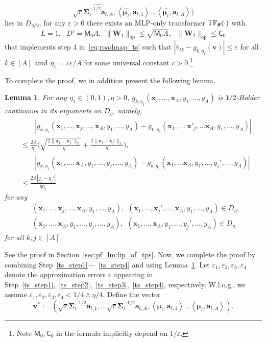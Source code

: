 \documentclass[10pt]{article}
\newtheorem{lemma}[theorem]{Lemma}
\newcommand{\eps}{\varepsilon}
\newcommand{\lops}[1]{\|{#1}\|_{\mathrm{op}}}
\newcommand{\<}{\left\langle}
\renewcommand{\>}{\right\rangle}
\newcommand{\TF}{{\rm TF}}
\newcommand{\Tpsmean}{{{\mathbf\mu}}}
\newcommand{\Tpscov}{{{\mathbf\Sigma}}}
\newcommand{\Tpsparn}{{r}}
\newcommand{\trunprob}{{\eta_1}}
\newcommand{\Trunreg}{{D}}
\newcommand{\Trunregp}{{\eta}}
\newcommand{\bigvec}{{\mathbf{v}}}
\newcommand{\neuron}{{\mathsf{M_0}}}
\newcommand{\weightn}{{{\mathsf{C_0}}}}
\def\bW{{\mathbf W}}
\def\btheta{{\boldsymbol \theta}}
\def\ba{{\mathbf a}}
\def\bx{{\mathbf x}}
\begin{document}
\begin{enumerate}[label=Step \arabic*,ref= \arabic*]
$$        \sqrt{\Tpsparn}\widehat{\Tpscov_t^{-1/2}\ba_{t,A}},
        \<\widehat{\Tpsmean_t},\ba_{t,1}\>\ldots
        \<\widehat{\Tpsmean_t},\ba_{t,A}\>)$$ lies in $\Trunreg_{\Trunregp/2}$, for any $\eps>0$ there exists an MLP-only transformer $\TF_\btheta(\cdot)$ with
    $$
    L=1,~~~D'= \neuron A,~~\lops{\bW_1}\leq \sqrt{\neuron A}, ~~~\lops{\bW_2}\leq \weightn$$
  that implements step 4 in~\eqref{eq:roadmap_ts} such that $|\widehat v_{tk}-g_{k,\trunprob}(\bigvec)|\leq \eps$ for all $k\in[A]$ amd $\trunprob=c\eps/A$ for some universal constant $c>0$.\footnote{Note $\neuron,\weightn$ in the formula implicitly depend on $1/\eps$.}
\end{enumerate}
To complete the proof, we in addition present the following lemma.
\begin{lemma}\label{lm:lip_of_tps}
For any $\trunprob\in(0,1),\Trunregp>0$, $g_{k,\trunprob}(\bx_1,\ldots,\bx_A,y_1,\ldots,y_A)$ is $1/2$-Holder continuous in its arguments on $\Trunreg_\Trunregp$, namely,
    \begin{align*}
        &\qquad|g_{k,\trunprob}(\bx_1,\ldots,\bx_j,\ldots,\bx_A,y_1,\ldots,y_A)-g_{k,\trunprob}(\bx_1,\ldots,\bx'_j,\ldots\bx_A,y_1,\ldots,y_A)|
        \\
        &
        \leq \frac{2A}{\trunprob}\Big(\sqrt{\frac{2\|\bx_j-\bx_j'\|_2}{\Trunregp}}+\frac{2\|\bx_j-\bx_j'\|_2}{\Trunregp}\Big),
        \\
           &\qquad |g_{k,\trunprob}(\bx_1,\ldots,\bx_A,y_1,\ldots,y_j,\ldots,y_A)-g_{k,\trunprob}(\bx_1,\ldots\bx_A,y_1,\ldots,y_j',\ldots,y_A)|
           \\
        &\leq
       \frac{2A|y_j-y_j'|}{\Trunregp\trunprob}
    \end{align*}
    for any \begin{align*}&(\bx_1,\ldots,\bx_j,\ldots,\bx_A,y_1,\ldots,y_A),~~(\bx_1,\ldots,\bx_j',\ldots,\bx_A,y_1,\ldots,y_A)\in\Trunreg_\Trunregp ,\\&(\bx_1,\ldots,\bx_A,y_1,\ldots,y_j,\ldots,y_A),~~(\bx_1,\ldots,\bx_A,y_1,\ldots,y_j',\ldots,y_A)\in\Trunreg_\Trunregp
    \end{align*}
  for all $k,j\in[A]$.
\end{lemma}
See the proof in Section~\ref{sec:pf_lm:lip_of_tps}.
Now, we complete the proof by combining Step~\ref{ts_step1}---~\ref{ts_step4} and using Lemma~\ref{lm:lip_of_tps}.
Let $\eps_1,\eps_2,\eps_3,\eps_4$ denote the approximation errors $\eps$ appearing in Step~\ref{ts_step1},~\ref{ts_step2},~\ref{ts_step3},~\ref{ts_step4}, respectively. W.l.o.g., we assume $\eps_1,\eps_2,\eps_3,\eps_4<1/4\wedge \Trunregp/4$. Define the vector $$\bigvec^*:=(\sqrt{\Tpsparn}{\Tpscov_t^{-1/2}\ba_{t,1}},\ldots
        \sqrt{\Tpsparn}{\Tpscov_t^{-1/2}\ba_{t,A}},
        \<{\Tpsmean_t},\ba_{t,1}\>\ldots
        \<{\Tpsmean_t},\ba_{t,A}\>).$$
\end{document}
